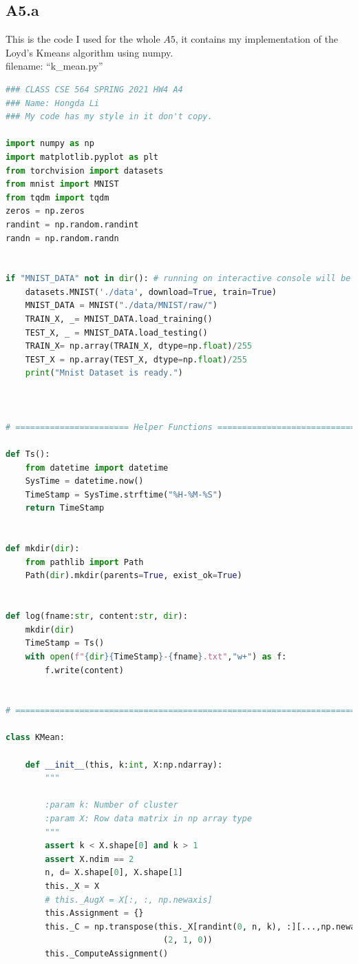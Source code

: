 \documentclass[]{article}
\begin{document}
    \subsection*{A5.a}\label{A5.a}
        This is the code I used for the whole $A5$, it contains my implementation of the Loyd's Kmeans algorithm using numpy. 
        \\[1.1em]
        filename: ``k\_mean.py''
        \begin{lstlisting}[language=python]
### CLASS CSE 564 SPRING 2021 HW4 A4
### Name: Hongda Li
### My code has my style in it don't copy.

import numpy as np
import matplotlib.pyplot as plt
from torchvision import datasets
from mnist import MNIST
from tqdm import tqdm
zeros = np.zeros
randint = np.random.randint
randn = np.random.randn


if "MNIST_DATA" not in dir(): # running on interactive console will be faster
    datasets.MNIST('./data', download=True, train=True)
    MNIST_DATA = MNIST("./data/MNIST/raw/")
    TRAIN_X, _= MNIST_DATA.load_training()
    TEST_X, _ = MNIST_DATA.load_testing()
    TRAIN_X= np.array(TRAIN_X, dtype=np.float)/255
    TEST_X = np.array(TEST_X, dtype=np.float)/255
    print("Mnist Dataset is ready.")



# ======================= Helper Functions =====================================

def Ts():
    from datetime import datetime
    SysTime = datetime.now()
    TimeStamp = SysTime.strftime("%H-%M-%S")
    return TimeStamp


def mkdir(dir):
    from pathlib import Path
    Path(dir).mkdir(parents=True, exist_ok=True)


def log(fname:str, content:str, dir):
    mkdir(dir)
    TimeStamp = Ts()
    with open(f"{dir}{TimeStamp}-{fname}.txt","w+") as f:
        f.write(content)


# ==============================================================================

class KMean:

    def __init__(this, k:int, X:np.ndarray):
        """

        :param k: Number of cluster
        :param X: Row data matrix in np array type
        """
        assert k < X.shape[0] and k > 1
        assert X.ndim == 2
        n, d= X.shape[0], X.shape[1]
        this._X = X
        # this._AugX = X[:, :, np.newaxis]
        this.Assignment = {}
        this._C = np.transpose(this._X[randint(0, n, k), :][...,np.newaxis],
                                (2, 1, 0))
        this._ComputeAssignment()


\end{lstlisting}
\end{document}
